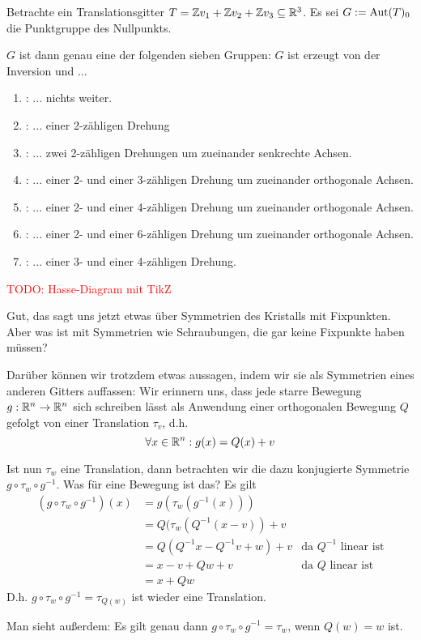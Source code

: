 \begin{theorem}
Betrachte ein Translationsgitter $T=\mathbb{Z} v_1+\mathbb{Z} v_2+\mathbb{Z} v_3\subseteq\mathbb{R}^3$. Es sei $G:=\operatorname{Aut}(T)_0$ die Punktgruppe des Nullpunkts.

$G$ ist dann genau eine der folgenden sieben Gruppen: $G$ ist erzeugt von der Inversion und ...
\begin{enumerate}
\item {}: ... nichts weiter.
\item {}: ... einer 2-zähligen Drehung
\item {}: ... zwei 2-zähligen Drehungen um zueinander senkrechte Achsen.
\item {}: ... einer 2- und einer 3-zähligen Drehung um zueinander orthogonale Achsen.
\item {}: ... einer 2- und einer 4-zähligen Drehung um zueinander orthogonale Achsen.
\item {}: ... einer 2- und einer 6-zähligen Drehung um zueinander orthogonale Achsen.
\item {}: ... einer 3- und einer 4-zähligen Drehung.
\end{enumerate}
\end{theorem}

\textcolor{red}{TODO: Hasse-Diagram mit TikZ}

\begin{remark}
Gut, das sagt uns jetzt etwas über Symmetrien des Kristalls mit Fixpunkten. Aber was ist mit Symmetrien wie Schraubungen, die gar keine Fixpunkte haben müssen?

Darüber können wir trotzdem etwas aussagen, indem wir sie als Symmetrien eines anderen Gitters auffassen: Wir erinnern uns, dass jede starre Bewegung $g:\mathbb{R}^n\to\mathbb{R}^n$ sich schreiben lässt als Anwendung einer orthogonalen Bewegung $Q$ gefolgt von einer Translation $\tau_v$, d.h.
\[\forall x\in\mathbb{R}^n: g(x)=Q(x)+v\]

Ist nun $\tau_w$ eine Translation, dann betrachten wir die dazu konjugierte Symmetrie $g\circ\tau_w\circ g^{-1}$. Was für eine Bewegung ist das? Es gilt
\begin{align*}
(g\circ\tau_w\circ g^{-1})(x) &= g(\tau_w(g^{-1}(x))) \\
&= Q(\tau_w(Q^{-1}(x-v))+v \\
&= Q(Q^{-1}x-Q^{-1}v+w)+v &\text{da $Q^{-1}$ linear ist}\\
&= x-v+Qw+v &\text{da $Q$ linear ist}\\
&= x+Qw
\end{align*}
D.h. $g\circ\tau_w\circ g^{-1} = \tau_{Q(w)}$ ist wieder eine Translation.

Man sieht außerdem: Es gilt genau dann $g\circ\tau_w\circ g^{-1} = \tau_w$, wenn $Q(w)=w$ ist.
\end{remark}

